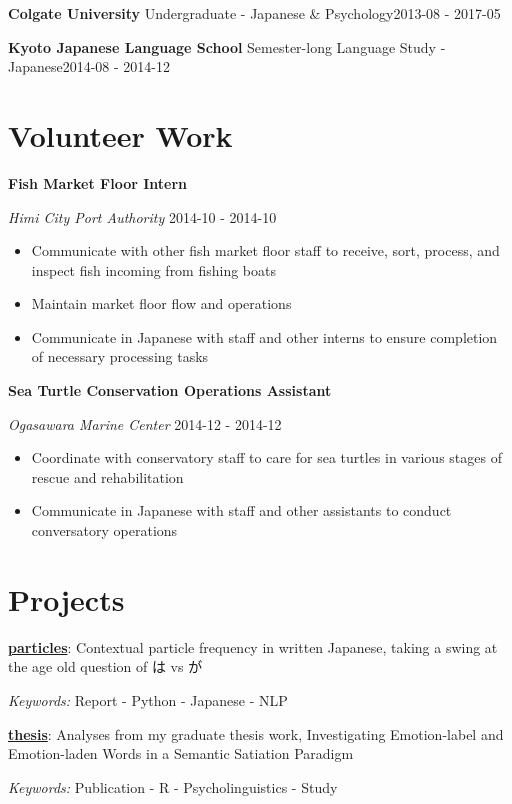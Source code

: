 \documentclass[a4paper,9pt]{extarticle}
\begin{document}
\noindent\textbf{Colgate University}
Undergraduate - Japanese \& Psychology\hfill2013-08 - 2017-05

\noindent\textbf{Kyoto Japanese Language School}
Semester-long Language Study - Japanese\hfill2014-08 - 2014-12

\section*{Volunteer Work}
\noindent\textbf{Fish Market Floor Intern} 

\noindent\textit{Himi City Port Authority} \hfill 2014-10 - 2014-10
\begin{itemize}\item Communicate with other fish market floor staff to receive, sort, process, and inspect fish incoming from fishing boats
\item Maintain market floor flow and operations
\item Communicate in Japanese with staff and other interns to ensure completion of necessary processing tasks
\end{itemize}
\noindent\textbf{Sea Turtle Conservation Operations Assistant} 

\noindent\textit{Ogasawara Marine Center} \hfill 2014-12 - 2014-12
\begin{itemize}\item Coordinate with conservatory staff to care for sea turtles in various stages of rescue and rehabilitation
\item Communicate in Japanese with staff and other assistants to conduct conversatory operations
\end{itemize}

\section*{Projects}
\noindent\textbf{\href{https://github.com/ryancahildebrandt/particles}{particles}}: Contextual particle frequency in written Japanese, taking a swing at the age old question of は vs が

\textit{Keywords:} Report - Python - Japanese - NLP

\noindent\textbf{\href{https://github.com/ryancahildebrandt/thesis}{thesis}}: Analyses from my graduate thesis work, Investigating Emotion-label and Emotion-laden Words in a Semantic Satiation Paradigm

\textit{Keywords:} Publication - R - Psycholinguistics - Study
\end{document}
